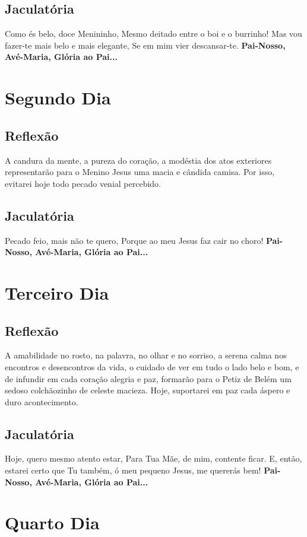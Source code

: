 \documentclass[11pt]{article}
\begin{document}
\subsection{Jaculatória}
Como és belo, doce Menininho,
Mesmo deitado entre o boi e o burrinho!
Mas vou fazer-te mais belo e mais elegante,
Se em mim vier descansar-te.
\textbf{Pai-Nosso, Avé-Maria, Glória ao Pai... }

\section{Segundo Dia}
\subsection{Reflexão}
A candura da mente, a pureza do coração, a modéstia dos atos exteriores representarão para o Menino Jesus uma macia e cândida camisa. Por isso, evitarei hoje todo pecado venial percebido.
\subsection{Jaculatória}
Pecado feio, mais não te quero,
Porque ao meu Jesus faz cair no choro!
\textbf{Pai-Nosso, Avé-Maria, Glória ao Pai... }

\section{Terceiro Dia}
\subsection{Reflexão}
A amabilidade no rosto, na palavra, no olhar e no sorriso, a serena calma nos encontros e desencontros da vida, o cuidado de ver em tudo o lado belo e bom, e de infundir em cada coração alegria e paz, formarão para o Petiz de Belém um sedoso colchãozinho de celeste macieza. Hoje, suportarei em paz cada áspero e duro acontecimento.
\subsection{Jaculatória}
Hoje, quero mesmo atento estar,
Para Tua Mãe, de mim, contente ficar.
E, então, estarei certo que Tu também,
ó meu pequeno Jesus, me quererás bem!
\textbf{Pai-Nosso, Avé-Maria, Glória ao Pai... }

\section{Quarto Dia}
\end{document}
